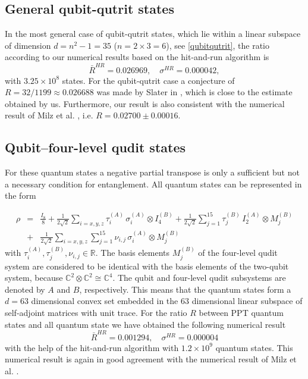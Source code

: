 \documentclass[12pt]{iopart}
\begin{document}
\subsection{General qubit-qutrit states}
\label{sec:qbqtgen}

In the most general case of qubit-qutrit states, which lie within a linear subspace of dimension $d=n^2- 1 = 35$ ($n=2\times 3=6$), see \eqref{qubitqutrit},  the ratio  according to our numerical results 
based on the hit-and-run algorithm is 
\begin{equation}
  \bar{R}^{HR}=0.026969, \quad \sigma^{HR}=0.000042,
\end{equation}
with $3.25 \times 10^8$ states. For the qubit-qutrit case a conjecture of $R=32/1199\approx 0.026688$ was made by Slater in \cite{Slaterqutrit}, which is close to the estimate obtained by us. 
Furthermore, our result is also consistent with the numerical result of  Milz et al. \cite{Milz}, i.e. $R=0.02700 \pm 0.00016$.

\subsection{Qubit--four-level qudit states}
\label{sec:qbqdgen}

For these quantum states a negative partial transpose is only a sufficient but not a necessary condition for entanglement.
All quantum states can be represented in the form

\begin{eqnarray}
\rho &=& \frac{I_8}{8} + \frac{1}{2\sqrt{2}}\sum_{i=x,y,z} \tau^{(A)}_i \,\sigma_i^{(A)} \otimes I^{(B)}_4 + \frac{1}{2\sqrt{2}}\sum^{15}_{j=1} \tau^{(B)}_j \,I^{(A)}_2 \otimes M^{(B)}_j \nonumber\\
 &+&
 \frac{1}{2\sqrt{2}}\sum_{i=x,y,z} \sum_{j=1}^{15} \nu_{i,j} \,\sigma_i^{(A)} \otimes {M}^{(B)}_j
\label{qubitqutrit}
\end{eqnarray}
with $\tau^{(A)}_i,\tau^{(B)}_j,\nu_{i,j}\in \mathbb{R}$. The basis elements ${M}^{(B)}_j$ of the four-level qudit system are considered to be identical with the basis elements of the two-qubit system, 
because $\mathbb{C}^2\otimes\mathbb{C}^2 \cong \mathbb{C}^4$.
The qubit and four-level qudit subsystems are denoted by $A$ and $B$, respectively. This means that the quantum states form a $d = 63$ dimensional convex set embedded in the $63$ dimensional linear subspace of
self-adjoint matrices with unit trace. For the ratio $R$ between PPT quantum states and all quantum state we have obtained the following numerical result
\begin{equation}
 \bar{R}^{HR}=0.001294, \quad \sigma^{HR}=0.000004
\end{equation}
with the help of the hit-and-run algorithm  with $1.2 \times 10^9$ quantum states. This numerical result is again in good agreement with the numerical result of Milz et al. \cite{Milz}.
\end{document}
